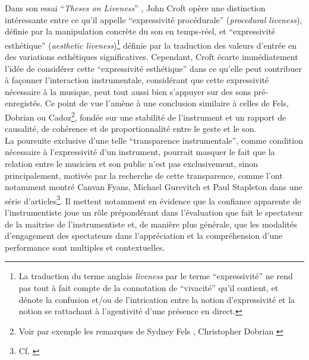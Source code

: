 \indent Dans son essai ``\textit{Theses on Liveness}'' \cite{croft_theses_2007}, John Croft opère une distinction intéressante entre ce qu'il appelle ``expressivité procédurale'' (\textit{procedural liveness}), définie par la manipulation concrète du son en temps-réel, et ``expressivité esthétique'' (\textit{aesthetic liveness})\footnote{La traduction du terme anglais \textit{liveness} par le terme ``expressivité'' ne rend pas tout à fait compte de la connotation de ``vivacité'' qu'il contient, et dénote la confusion et/ou de l'intrication entre la notion d'expressivité et la notion se rattachant à l'agentivité d'une présence en direct.} définie par la traduction des valeurs d'entrée en des variations esthétiques significatives. Cependant, Croft écarte immédiatement l'idée de considérer cette ``expressivité esthétique'' dans ce qu'elle peut contribuer à façonner l'interaction instrumentale, considérant que cette expressivité nécessaire à la musique, peut tout aussi bien s'appuyer sur des sons pré-enregistés. Ce point de vue l'amène à une conclusion similaire à celles de Fels, Dobrian ou Cadoz\footnote{Voir par exemple les remarques de Sydney Fels \cite{fels_mapping_2002} , Christopher Dobrian \cite{dobrian_e_2006} }, fondée sur une stabilité de l'instrument et un rapport de causalité, de cohérence et de proportionnalité entre le geste et le son.\\
\indent La poursuite exclusive d'une telle ``transparence instrumentale'', comme condition nécessaire à l'expressivité d'un instrument, pourrait masquer le fait que la relation entre le musicien et son public n'est pas exclusivement, sinon principalement, motivée par la recherche de cette transparence, comme l'ont notamment montré Canvan Fyans, Michael Gurevitch et Paul Stapleton dans une série d'articles\footnote{Cf. \cite{fyans_where_2009, fyans_examining_2010, gurevich_digital_2011}}. Il mettent notamment en évidence que la confiance apparente de l'instrumentiste joue un rôle prépondérant dans l'évaluation que fait le spectateur de la maitrise de l'instrumentiste et, de manière plus générale, que les modalités d'engagement des spectateurs dans l'appréciation et la compréhension d'une performance sont multiples et contextuelles.\\
